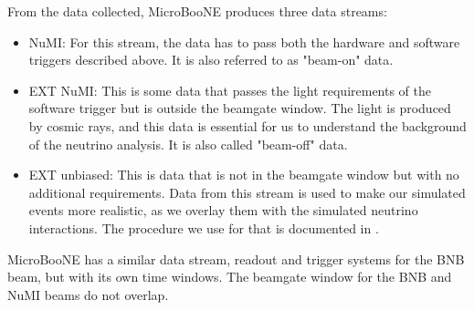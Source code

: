 From the data collected, MicroBooNE produces three data streams:
\begin{itemize}
    \item NuMI: For this stream, the data has to pass both the hardware and software triggers described above. It is also referred to as "beam-on" data. 
    \item EXT NuMI: This is some data that passes the light requirements of the software trigger but is outside the beamgate window. The light is produced by cosmic rays, and this data is essential for us to understand the background of the neutrino analysis. It is also called "beam-off" data. 
    \item EXT unbiased: This is data that is not in the beamgate window but with no additional requirements. Data from this stream is used to make our simulated events more realistic, as we overlay them with the simulated neutrino interactions. The procedure we use for that is documented in \cite{afro_phd}. 
\end{itemize}

MicroBooNE has a similar data stream, readout and trigger systems for the BNB beam, but with its own time windows. The beamgate window for the BNB and NuMI beams do not overlap. 

